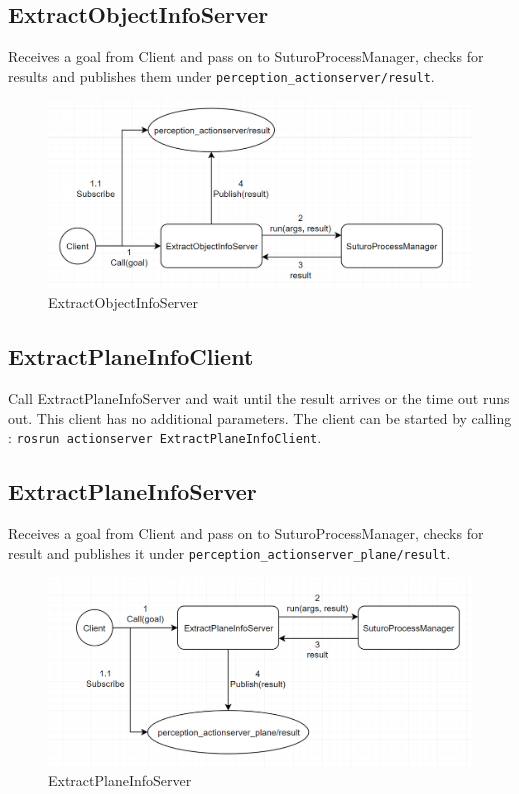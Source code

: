 \documentclass[main.tex]{subfiles}
\begin{document}
			\subsection{ExtractObjectInfoServer}
Receives a goal from Client and pass on to SuturoProcessManager, checks for results and publishes them under \texttt{perception\_actionserver/result}. 
			\begin{figure}[H]
   			 \centering
    			 \includegraphics[width=1\textwidth]{pictures/perception/suturo_ExtractObjectInfoServer.png}
   			 \caption{ExtractObjectInfoServer}
  			\end{figure}

			\subsection{ExtractPlaneInfoClient}
Call ExtractPlaneInfoServer and wait until the result arrives or the time out runs out. This client has no additional parameters.
The client can be started by calling : \texttt{rosrun actionserver ExtractPlaneInfoClient}.

			\subsection{ExtractPlaneInfoServer}
Receives a goal from Client and pass on to SuturoProcessManager, checks for result and publishes it under \texttt{perception\_actionserver\_plane/result}.
			\begin{figure}[H]
   			 \centering
    			 \includegraphics[width=1\textwidth]{pictures/perception/suturo_ExtractPlaneInfoServer.png}
   			 \caption{ExtractPlaneInfoServer}
  			\end{figure}
\end{document}
